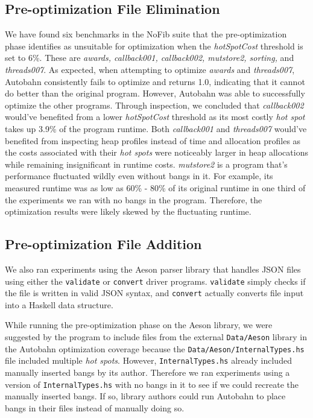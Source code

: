 \documentclass[format=sigplan]{acmart}
\newcommand{\hotspots}[0]{\textit{hot spots}}
\newcommand{\hotspotcost}[0]{\textit{hotSpotCost}}
\newcommand{\preopt}[0]{pre-optimization}
\newcommand{\Preopt}[0]{Pre-optimization}
\begin{document}
\subsection{\Preopt{} File Elimination}

We have found six benchmarks in the NoFib suite that the \preopt{} phase identifies as unsuitable for optimization when the \hotspotcost{} threshold is set to 6\%. These are \textit{awards, callback001, callback002, mutstore2, sorting,} and \textit{threads007}. As expected, when attempting to optimize \textit{awards} and \textit{threads007}, Autobahn consistently fails to optimize and returns 1.0, indicating that it cannot do better than the original program. However, Autobahn was able to successfully optimize the other programs. Through inspection, we concluded that \textit{callback002} would've benefited from a lower \hotspotcost{} threshold as its most costly \textit{hot spot} takes up 3.9\% of the program runtime. Both \textit{callback001} and \textit{threads007} would've benefited from inspecting heap profiles instead of time and allocation profiles as the costs associated with their \textit{hot spots} were noticeably larger in heap allocations while remaining insignificant in runtime costs. \textit{mutstore2} is a program that's performance fluctuated wildly even without bangs in it. For example, its measured runtime was as low as 60\% - 80\% of its original runtime in one third of the experiments we ran with no bangs in the program. Therefore, the optimization results were likely skewed by the fluctuating runtime.

\subsection{\Preopt{} File Addition}

We also ran experiments using the Aeson parser library that handles JSON files using either the \texttt{validate} or \texttt{convert} driver programs. \texttt{validate} simply checks if the file is written in valid JSON syntax, and \texttt{convert} actually converts file input into a Haskell data structure. 

While running the \preopt{} phase on the Aeson library, we were suggested by the program to include files from the external \texttt{Data/Aeson} library in the Autobahn optimization coverage because the \texttt{Data/Aeson/InternalTypes.hs} file included multiple \hotspots{}. However, \texttt{InternalTypes.hs} already included manually inserted bangs by its author. Therefore we ran experiments using a version of \texttt{InternalTypes.hs} with no bangs in it to see if we could recreate the manually inserted bangs. If so, library authors could run Autobahn to place bangs in their files instead of manually doing so. 
\end{document}

